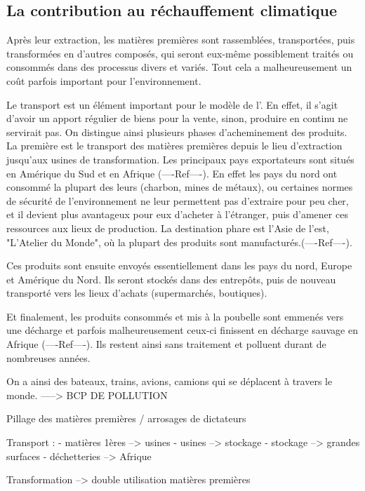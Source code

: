 \subsection{La contribution au réchauffement climatique}


Après leur extraction, les matières premières sont rassemblées, transportées, puis transformées en d'autres composés, qui seront eux-même possiblement traités ou consommés dans des processus divers et variés. Tout cela a malheureusement un coût parfois important pour l'environnement.

\medbreak Le transport est un élément important pour le modèle de l'\op. En effet, il s'agit d'avoir un apport régulier de biens pour la vente, sinon, produire en continu ne servirait pas. On distingue ainsi plusieurs phases d'acheminement des produits.
\\
La première est le transport des matières premières depuis le lieu d'extraction jusqu'aux usines de transformation. Les principaux pays exportateurs sont situés en Amérique du Sud et en Afrique (----Ref----). En effet les pays du nord ont consommé la plupart des leurs (charbon, mines de métaux), ou certaines normes de sécurité de l'environnement ne leur permettent pas d'extraire pour peu cher, et il devient plus avantageux pour eux d'acheter à l'étranger, puis d'amener ces ressources aux lieux de production. La destination phare est l'Asie de l'est, "L'Atelier du Monde", où la plupart des produits sont manufacturés.(----Ref----).

Ces produits sont ensuite envoyés essentiellement dans les pays du nord, Europe et Amérique du Nord. Ils seront stockés dans des entrepôts, puis de nouveau transporté vers les lieux d'achats (supermarchés, boutiques). 

Et finalement, les produits consommés et mis à la poubelle sont emmenés vers une décharge et parfois malheureusement ceux-ci finissent en décharge sauvage en Afrique (----Ref----). Ils restent ainsi sans traitement et polluent durant de nombreuses années.

On a ainsi des bateaux, trains, avions, camions qui se déplacent à travers le monde. 
-----> BCP DE POLLUTION


Pillage des matières premières / arrosages de dictateurs

Transport : 
 - matières 1ères --> usines
 - usines --> stockage
 - stockage --> grandes surfaces
 - déchetteries --> Afrique

Transformation
--> double utilisation matières premières


